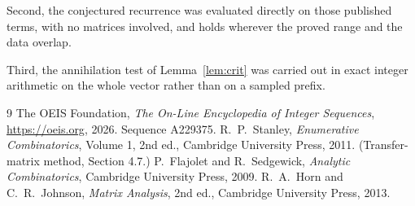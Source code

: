 \documentclass[11pt,a4paper]{article}
\theoremstyle{plain}
\theoremstyle{definition}
\begin{document}
Second, the conjectured recurrence was evaluated directly on those published terms, with no
matrices involved, and holds wherever the proved range and the data overlap.

Third, the annihilation test of Lemma~\ref{lem:crit} was carried out in exact integer
arithmetic on the whole vector rather than on a sampled prefix.

\begin{thebibliography}{9}
 The OEIS Foundation, \emph{The On-Line Encyclopedia of Integer
Sequences}, \url{https://oeis.org}, 2026. Sequence A229375.
 R.~P.~Stanley, \emph{Enumerative Combinatorics}, Volume 1, 2nd ed.,
Cambridge University Press, 2011. (Transfer-matrix method, Section 4.7.)
 P.~Flajolet and R.~Sedgewick, \emph{Analytic Combinatorics}, Cambridge
University Press, 2009.
 R.~A.~Horn and C.~R.~Johnson, \emph{Matrix Analysis}, 2nd ed., Cambridge
University Press, 2013.
\end{thebibliography}
\end{document}
